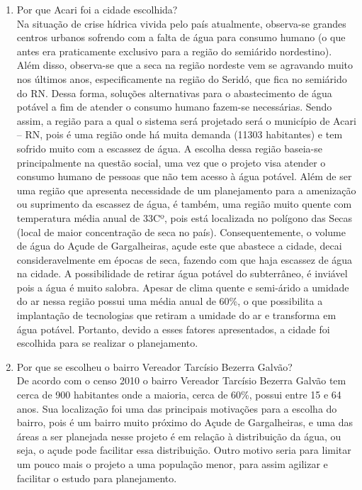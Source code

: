 \begin{enumerate}
\begin{enumerate}[label=\Alph*]
  \item Por que  Acari foi a cidade escolhida?\\
  Na situação de crise hídrica vivida pelo país atualmente, observa-se grandes centros urbanos sofrendo com a falta de água para consumo humano (o que antes era praticamente exclusivo para a região do semiárido nordestino). Além disso, observa-se que a seca na região nordeste vem se agravando muito nos últimos anos, especificamente na região do Seridó, que fica no semiárido do RN.
  Dessa forma, soluções alternativas para o abastecimento de água potável a fim de atender o consumo humano fazem-se necessárias. Sendo assim, a região para a qual o sistema será projetado será o município de Acari – RN, pois é uma região onde há muita demanda (11303 habitantes) e tem sofrido muito com a escassez de água. A escolha dessa região baseia-se principalmente na questão social, uma vez que o projeto visa atender o consumo humano de pessoas que não tem acesso à água potável.
  Além de ser uma região que apresenta necessidade de um planejamento para a amenização ou suprimento da escassez de água, é também, uma região muito quente com temperatura média anual de 33Cº, pois está localizada no polígono das Secas (local de maior concentração de seca no país). Consequentemente, o volume de água do Açude de Gargalheiras, açude este que abastece a cidade, decai consideravelmente em épocas de seca, fazendo com que haja escassez de água na cidade. A possibilidade de retirar água potável do subterrâneo, é inviável pois a água é muito salobra. Apesar de clima quente e semi-árido a umidade do ar nessa região  possui uma média anual de 60\%, o que possibilita a implantação de tecnologias que retiram a umidade do ar  e transforma em água potável. Portanto, devido a esses fatores apresentados, a cidade foi escolhida para se realizar o planejamento.

  \item Por que se escolheu o bairro Vereador Tarcísio Bezerra Galvão?\\
  De acordo com o censo 2010 o bairro Vereador Tarcísio Bezerra Galvão tem cerca de 900 habitantes onde a maioria, cerca de 60\%, possui entre 15 e 64 anos. Sua localização foi uma das principais motivações para a escolha do bairro, pois é um bairro muito próximo do Açude de Gargalheiras, e uma das áreas a ser planejada nesse projeto é em relação à distribuição da água, ou seja, o açude pode facilitar essa distribuição. Outro motivo seria para limitar um pouco mais o projeto a uma população menor, para assim agilizar e facilitar o estudo para planejamento.
\end{enumerate}


\end{enumerate}
